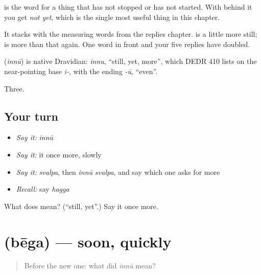  is the word for a thing that has not stopped or has not started. With  behind it you get \emph{not yet}, which is the single most useful thing in this chapter.

It stacks with the measuring words from the replies chapter.   is a little more still;   is more than that again. One word in front and your five replies have doubled.

\begin{cousinweb}
\textbf{} (\emph{innū}) is native Dravidian: \emph{innu}, \textquotedblleft{}still, yet, more\textquotedblright{}, which DEDR 410 lists on the near-pointing base \emph{i-}, with the ending \emph{-ū}, \textquotedblleft{}even\textquotedblright{}.
\end{cousinweb}

\begin{grammarlens}[title={What you've built}]
Three.
\end{grammarlens}

\subsection*{Your turn}
\begin{itemize}
\raggedright
  \item \emph{Say it:} \emph{innū}
  \item \emph{Say it:} it once more, slowly
  \item \emph{Say it:} \emph{svalpa}, then \emph{innū svalpa}, and say which one asks for more
  \item \emph{Recall:} say \emph{hagga}
\end{itemize}

\begin{tcolorbox}[breakable,colback=teal!4,colframe=teal!35!black,title={Before you move on}]
What does  mean? (\textquotedblleft{}still, yet\textquotedblright{}.) Say it once more.
\end{tcolorbox}
\section[\texorpdfstring{\kn{ಬೇಗ} (bēga)}{ಬೇಗ (bēga)}]{ (bēga) — soon, quickly}

\label{lesson:KA-C64-soon}



\begin{quote}
Before the new one: what did \emph{innū} mean?
\end{quote}

